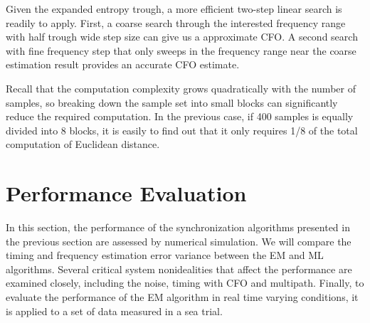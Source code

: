 \documentclass[journal,comsoc]{IEEEtran}
\begin{document}
Given the expanded entropy trough, a more efficient two-step linear search is readily to apply.
First, a coarse search through the interested frequency range with half trough wide step size can give us a approximate CFO.
A second search with fine frequency step that only sweeps in the frequency range near the coarse estimation result provides an accurate CFO estimate.

Recall that the computation complexity grows quadratically with the number of samples, so breaking down the sample set into small blocks can significantly reduce the required computation.
In the previous case, if 400 samples is equally divided into 8 blocks, it is easily to find out that it only requires 1/8 of the total computation of Euclidean distance. 




\section{Performance Evaluation}
\label{sec:performance}
In this section, the performance of the synchronization algorithms presented in the previous section are assessed by numerical simulation.
We will compare the timing and frequency estimation error variance between the EM and ML algorithms.
Several critical system nonidealities that affect the performance are examined closely, including the noise, timing with CFO and multipath.
Finally, to evaluate the performance of the EM algorithm in real time varying conditions, it is applied to a set of data measured in a sea trial.
\end{document}
